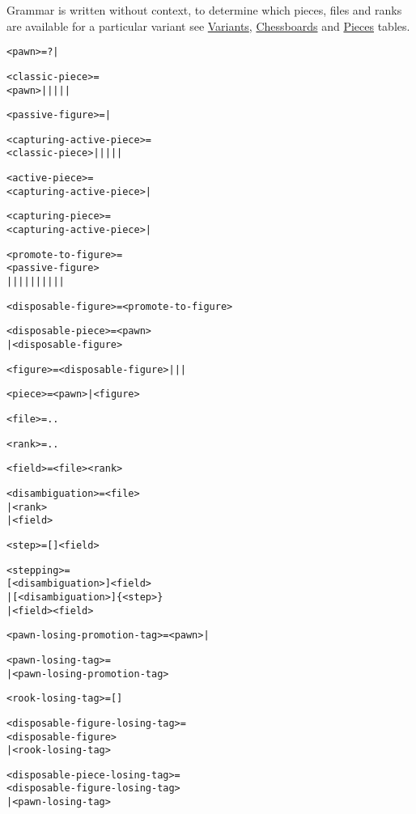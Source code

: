 Grammar is written without context, to determine which pieces, files and ranks
are available for a particular variant see
\hyperref[tbl:Appendix/Introduction/Variants]{Variants},
\hyperref[tbl:Appendix/Introduction/Chessboards]{Chessboards} and
\hyperref[tbl:Appendix/Introduction/Pieces]{Pieces} tables.

\clearpage %

\begin{alltt}
<pawn> = ? | 

<classic-piece> =
  <pawn> |  |  |  |  | 

<passive-figure> =  | 

<capturing-active-piece> =
  <classic-piece> |  |  |  |  | 

<active-piece> =
  <capturing-active-piece> | 

<capturing-piece> =
  <capturing-active-piece> | 

<promote-to-figure> =
  <passive-figure>
|  |  |  |  |  |  |  |  |  | 

<disposable-figure> = <promote-to-figure>

<disposable-piece> = <pawn>
                   | <disposable-figure>

<figure> = <disposable-figure> |  |  | 

<piece> = <pawn> | <figure>
\end{alltt}

\clearpage %

\begin{alltt}
<file> =  .. 

<rank> =  .. 

<field> = <file><rank>

<disambiguation> = <file>
                 | <rank>
                 | <field>

<step> = []<field>

<stepping> =
  [<disambiguation>]<field>
| [<disambiguation>]\{<step>\}
| <field>\alg{-}<field>

<pawn-losing-promotion-tag> = <pawn> | 

<pawn-losing-tag> = 
| <pawn-losing-promotion-tag>

<rook-losing-tag> = [\alg{\&\&}]

<disposable-figure-losing-tag> =
  <disposable-figure>
| <rook-losing-tag>

<disposable-piece-losing-tag> =
  <disposable-figure-losing-tag>
| <pawn-losing-tag>
\end{alltt}

